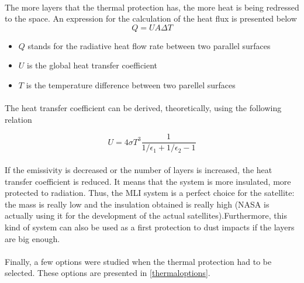 \paragraph{}The more layers that the thermal protection has, the more heat is being redressed to the space. An expression for the calculation of the heat flux is presented below
\begin{equation}
Q=UA\Delta T
\label{eqheatbasic}
\end{equation}

\begin{itemize}
\item $Q$ stands for the radiative heat flow rate between two parallel surfaces
\item $U$ is the global heat transfer coefficient
\item $T$ is the temperature difference between two parellel surfaces
\end{itemize}

\paragraph{}The heat transfer coefficient can be derived, theoretically, using the following relation

\begin{equation}
U=4\sigma T^3 \frac{1}{1/\epsilon_{1}+1/ \epsilon_{2}-1}
\label{uderivation}
\end{equation}

\paragraph{}If the emissivity is decreased or the number of layers is increased, the heat transfer coefficient is reduced. It means that the system is more insulated, more protected to radiation. Thus, the MLI system is a perfect choice for the satellite: the mass is really low and the insulation obtained is really high (NASA is actually using it for the development of the actual satellites).Furthermore, this kind of system can also be used as a first protection to dust impacts if the layers are big enough.

\paragraph{}Finally, a few options were studied when the thermal protection had to be selected. These options are presented in \ref{thermaloptions}.

